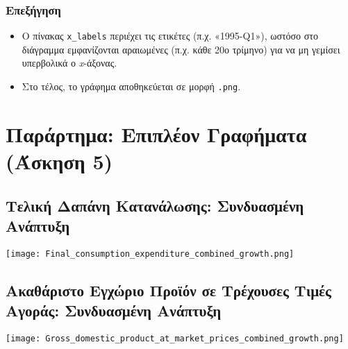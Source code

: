 \documentclass{book}
\begin{document}
\subsection*{Επεξήγηση}
\begin{itemize}
  \item Ο πίνακας \texttt{x\_labels} περιέχει τις ετικέτες (π.χ. «1995-Q1»), ωστόσο στο διάγραμμα εμφανίζονται αραιωμένες (π.χ. κάθε 20ο τρίμηνο) για να μη γεμίσει υπερβολικά ο \textit{x}-άξονας.
  \item Στο τέλος, το γράφημα αποθηκεύεται σε μορφή \texttt{.png}.
\end{itemize}


\chapter{Παράρτημα: Επιπλέον Γραφήματα (Άσκηση 5)}

\graphicspath{{/Users/thodoreskourtales/TK.MT.1/exercise.5/}}

\section{Τελική Δαπάνη Κατανάλωσης: Συνδυασμένη Ανάπτυξη}
\begin{tcolorbox}[colback=white,colframe=black,title={Final consumption expenditure: combined growth}]
  \centering
  \texttt{[image: Final\_consumption\_expenditure\_combined\_growth.png]}
  \vspace{0.5em}

\end{tcolorbox}
\FloatBarrier

\section{Ακαθάριστο Εγχώριο Προϊόν σε Τρέχουσες Τιμές Αγοράς: Συνδυασμένη Ανάπτυξη}
\begin{tcolorbox}[colback=white,colframe=black,title={Gross domestic product at market prices: combined growth}]
  \centering
  \texttt{[image: Gross\_domestic\_product\_at\_market\_prices\_combined\_growth.png]}
  \vspace{0.5em}

\end{tcolorbox}
\FloatBarrier
\end{document}
